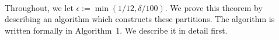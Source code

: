 %
%

\noindent
\\

Throughout, we let $\epsilon := \min(1/12,\delta/100)$.
We prove this theorem by describing an algorithm which constructs these partitions.
The algorithm is written formally in Algorithm~1. We describe it in detail first.

